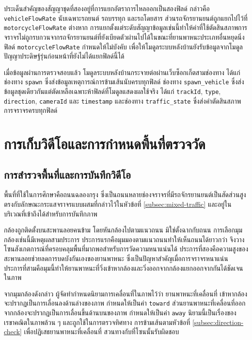ประเด็นสำคัญของสัญญาชุดที่สองอยู่ที่การแยกอัตราการไหลออกเป็นสองฟิลด์ กล่าวคือ \texttt{vehicleFlowRate} นับเฉพาะรถยนต์ รถบรรทุก และรถโดยสาร ส่วนรถจักรยานยนต์ถูกแยกไปไว้ที่ \texttt{motorcycleFlowRate} ต่างหาก การแยกตั้งแต่ระดับสัญญาข้อมูลเช่นนี้ทำให้ค่าที่ใช้ตัดสินสภาพการจราจรไม่ถูกรบกวนจากรถจักรยานยนต์ที่ยังเบียดตัวผ่านไปได้ในขณะที่ยานพาหนะประเภทอื่นหยุดนิ่ง ฟิลด์ \texttt{motorcycleFlowRate} กำหนดให้ไม่บังคับ เพื่อให้โมดูลระบบหลังบ้านยังรับข้อมูลจากโมดูลปัญญาประดิษฐ์รุ่นก่อนหน้าที่ยังไม่ได้แยกฟิลด์นี้ได้

เมื่อข้อมูลผ่านการตรวจสอบแล้ว โมดูลระบบหลังบ้านกระจายต่อผ่านเว็บซ็อกเก็ตสามช่องทาง ได้แก่ ช่องทาง \texttt{spawn} ซึ่งส่งข้อมูลเหตุการณ์การข้ามเส้นนับครบทุกฟิลด์ ช่องทาง \texttt{spawn\_vehicle} ซึ่งส่งข้อมูลชุดเดียวกันแต่ตัดเหลือเฉพาะห้าฟิลด์ที่โมดูลแสดงผลใช้จริง ได้แก่ \texttt{trackId}, \texttt{type}, \texttt{direction}, \texttt{cameraId} และ \texttt{timestamp} และช่องทาง \texttt{traffic\_state} ซึ่งส่งคำตัดสินสภาพการจราจรครบทุกฟิลด์

\section{การเก็บวิดีโอและการกำหนดพื้นที่ตรวจวัด}
\label{sec:data-collection}

\subsection{การสำรวจพื้นที่และการบันทึกวิดีโอ}
\label{subsec:site-survey}

พื้นที่ที่ใช้ในการศึกษาคือถนนฉลองกรุง ซึ่งเป็นถนนหลายช่องจราจรที่มีรถจักรยานยนต์เป็นสัดส่วนสูง ตรงกับลักษณะกระแสจราจรแบบผสมที่กล่าวไว้ในหัวข้อที่ \ref{subsec:mixed-traffic} และอยู่ในบริเวณที่เข้าถึงได้สำหรับการบันทึกภาพ

กล้องถูกติดตั้งบนสะพานลอยคนข้าม โดยหันกล้องไปตามแนวถนน มิใช่ตั้งฉากกับถนน  การเลือกมุมกล้องเช่นนี้มีเหตุผลสามประการ ประการแรกคือมุมมองตามแนวถนนทำให้เห็นถนนได้ยาวกว่า จึงวางโซนสังเกตการณ์ที่ครอบคลุมพื้นที่มากพอสำหรับการวัดความหนาแน่นได้ ประการที่สองคือความสูงของสะพานลอยช่วยลดการบดบังกันเองของยานพาหนะ ซึ่งเป็นปัญหาสำคัญเมื่อการจราจรหนาแน่น ประการที่สามคือมุมนี้ทำให้ยานพาหนะที่วิ่งเข้าหากล้องและวิ่งออกจากกล้องแยกออกจากกันได้ชัดเจนในภาพ

จากมุมกล้องดังกล่าว ผู้จัดทำกำหนดนิยามการเคลื่อนที่ในภาพไว้ว่า ยานพาหนะที่เคลื่อนที่
เข้าหากล้องจะปรากฏเป็นการเลื่อนลงด้านล่างของภาพ กำหนดให้เป็นค่า \texttt{toward}
ส่วนยานพาหนะที่เคลื่อนที่ออกจากกล้องจะปรากฏเป็นการเลื่อนขึ้นด้านบนของภาพ กำหนดให้เป็นค่า
\texttt{away} นิยามนี้เป็นเรื่องของเรขาคณิตในภาพล้วน ๆ และถูกใช้ในการตรวจทิศทาง
การข้ามเส้นตามหัวข้อที่ \ref{subsec:direction-check} เพื่อปฏิเสธยานพาหนะที่เคลื่อนที่
สวนทางกับที่โซนนั้นรับผิดชอบ

